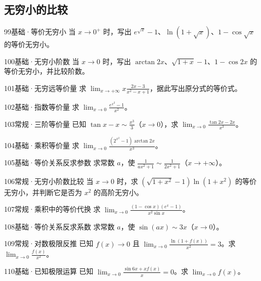\subsection{无穷小的比较}
\begin{exercise}{99}{基础·等价无穷小}
当 $x\to0^+$ 时，写出 $e^{\sqrt x}-1$、$\ln(1+\sqrt x)$、$1-\cos\sqrt x$ 的等价无穷小。
\end{exercise}
\begin{exercise}{100}{基础·无穷小阶数}
当 $x\to0$ 时，写出 $\arctan2x$、$\sqrt{1+x}-1$、$1-\cos2x$ 的等价无穷小，并比较阶数。
\end{exercise}
\begin{exercise}{101}{基础·无穷远等价量}
求 $\lim_{x\to+\infty}x\frac{2x-3}{x^2-x+1}$，据此写出原分式的等价式。
\end{exercise}
\begin{exercise}{102}{基础·指数等价量}
求 $\lim_{x\to0}\frac{e^{x^2}-1}{x^2}$。
\end{exercise}
\begin{exercise}{103}{常规·三阶等价量}
已知 $\tan x-x\sim\frac{x^3}{3}$（$x\to0$），求 $\lim_{x\to0}\frac{\tan2x-2x}{x^3}$。
\end{exercise}
\begin{exercise}{104}{基础·乘积等价量}
求 $\lim_{x\to0}\frac{(2^{x^2}-1)\arctan2x}{x^3}$。
\end{exercise}
\begin{exercise}{105}{基础·等价关系反求参数}
求常数 $a$，使 $\frac{1}{ax^2+1}\sim\frac{1}{2x^2+1}$（$x\to+\infty$）。
\end{exercise}
\begin{exercise}{106}{常规·无穷小阶数比较}
当 $x\to0$ 时，求 $(\sqrt{1+x^2}-1)\ln(1+x^2)$ 的等价无穷小，并判断它是否为 $x^2$ 的高阶无穷小。
\end{exercise}
\begin{exercise}{107}{常规·乘积中的等价代换}
求 $\lim_{x\to0}\frac{(1-\cos x)(e^x-1)}{x^2\sin x}$。
\end{exercise}
\begin{exercise}{108}{基础·等价关系反求系数}
求常数 $a$，使 $\sin(ax)\sim3x$（$x\to0$）。
\end{exercise}
\begin{exercise}{109}{常规·对数极限反推}
已知 $f(x)\to0$ 且 $\lim_{x\to0}\frac{\ln(1+f(x))}{x^2}=3$。求 $\lim_{x\to0}\frac{f(x)}{x^2}$。
\end{exercise}
\begin{exercise}{110}{基础·已知极限运算}
已知 $\lim_{x\to0}\frac{\sin6x+xf(x)}{x}=0$。求 $\lim_{x\to0}f(x)$。
\end{exercise}
